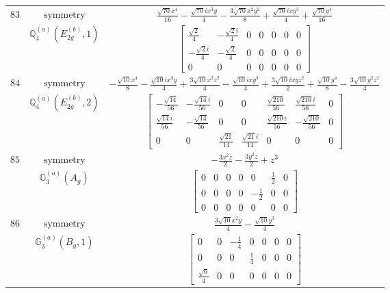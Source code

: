 \documentclass[fleqn,8pt,landscape]{jsarticle}
\begin{document}
\begin{longtable}{ccc}
$ 83 $ & $ \text{symmetry} $ & $ \frac{\sqrt{70} x^{4}}{16} - \frac{\sqrt{70} i x^{3} y}{4} - \frac{3 \sqrt{70} x^{2} y^{2}}{8} + \frac{\sqrt{70} i x y^{3}}{4} + \frac{\sqrt{70} y^{4}}{16} $ \\
$  $ & $ \mathbb{Q}_{4}^{(a)}(E_{2g}^{(b)},1) $ & $ \begin{bmatrix} \frac{\sqrt{2}}{4} & - \frac{\sqrt{2} i}{4} & 0 & 0 & 0 & 0 & 0 \\ - \frac{\sqrt{2} i}{4} & - \frac{\sqrt{2}}{4} & 0 & 0 & 0 & 0 & 0 \\ 0 & 0 & 0 & 0 & 0 & 0 & 0 \end{bmatrix} $ \\ \hline
$ 84 $ & $ \text{symmetry} $ & $ - \frac{\sqrt{10} x^{4}}{8} - \frac{\sqrt{10} i x^{3} y}{4} + \frac{3 \sqrt{10} x^{2} z^{2}}{4} - \frac{\sqrt{10} i x y^{3}}{4} + \frac{3 \sqrt{10} i x y z^{2}}{2} + \frac{\sqrt{10} y^{4}}{8} - \frac{3 \sqrt{10} y^{2} z^{2}}{4} $ \\
$  $ & $ \mathbb{Q}_{4}^{(a)}(E_{2g}^{(b)},2) $ & $ \begin{bmatrix} - \frac{\sqrt{14}}{56} & - \frac{\sqrt{14} i}{56} & 0 & 0 & \frac{\sqrt{210}}{56} & \frac{\sqrt{210} i}{56} & 0 \\ \frac{\sqrt{14} i}{56} & - \frac{\sqrt{14}}{56} & 0 & 0 & \frac{\sqrt{210} i}{56} & - \frac{\sqrt{210}}{56} & 0 \\ 0 & 0 & \frac{\sqrt{21}}{14} & \frac{\sqrt{21} i}{14} & 0 & 0 & 0 \end{bmatrix} $ \\ \hline
$ 85 $ & $ \text{symmetry} $ & $ - \frac{3 x^{2} z}{2} - \frac{3 y^{2} z}{2} + z^{3} $ \\
$  $ & $ \mathbb{G}_{3}^{(a)}(A_{g}) $ & $ \begin{bmatrix} 0 & 0 & 0 & 0 & 0 & \frac{1}{2} & 0 \\ 0 & 0 & 0 & 0 & - \frac{1}{2} & 0 & 0 \\ 0 & 0 & 0 & 0 & 0 & 0 & 0 \end{bmatrix} $ \\ \hline
$ 86 $ & $ \text{symmetry} $ & $ \frac{3 \sqrt{10} x^{2} y}{4} - \frac{\sqrt{10} y^{3}}{4} $ \\
$  $ & $ \mathbb{G}_{3}^{(a)}(B_{g},1) $ & $ \begin{bmatrix} 0 & 0 & - \frac{1}{4} & 0 & 0 & 0 & 0 \\ 0 & 0 & 0 & \frac{1}{4} & 0 & 0 & 0 \\ \frac{\sqrt{6}}{4} & 0 & 0 & 0 & 0 & 0 & 0 \end{bmatrix} $ \\ \hline

\end{longtable}
\end{document}

